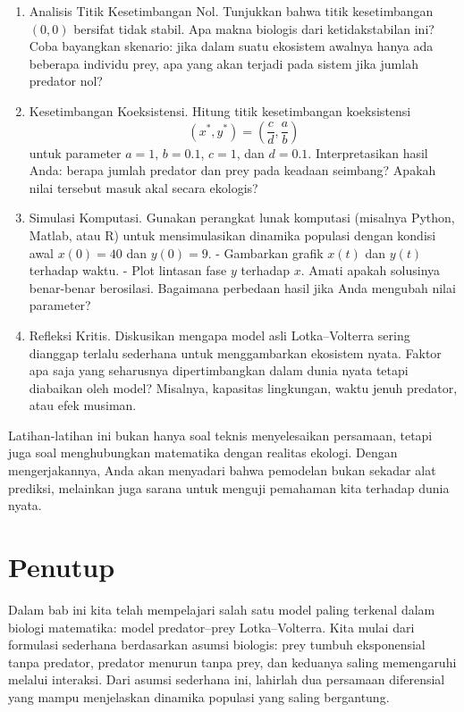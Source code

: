 \documentclass{bukumjh}
\begin{document}
\begin{enumerate}
    \item {\jsg Analisis Titik Kesetimbangan Nol.}  
    Tunjukkan bahwa titik kesetimbangan $(0,0)$ bersifat tidak stabil. Apa makna biologis dari ketidakstabilan ini? Coba bayangkan skenario: jika dalam suatu ekosistem awalnya hanya ada beberapa individu prey, apa yang akan terjadi pada sistem jika jumlah predator nol?

    \item {\jsg Kesetimbangan Koeksistensi.}  
    Hitung titik kesetimbangan koeksistensi
    \[
    \left(x^\ast, y^\ast\right) = \left(\frac{c}{d}, \frac{a}{b}\right)
    \]
    untuk parameter $a=1$, $b=0.1$, $c=1$, dan $d=0.1$. Interpretasikan hasil Anda: berapa jumlah predator dan prey pada keadaan seimbang? Apakah nilai tersebut masuk akal secara ekologis?

    \item {\jsg Simulasi Komputasi.}  
    Gunakan perangkat lunak komputasi (misalnya Python, Matlab, atau R) untuk mensimulasikan dinamika populasi dengan kondisi awal $x(0)=40$ dan $y(0)=9$.  
    - Gambarkan grafik $x(t)$ dan $y(t)$ terhadap waktu.  
    - Plot lintasan fase $y$ terhadap $x$.  
    Amati apakah solusinya benar-benar berosilasi. Bagaimana perbedaan hasil jika Anda mengubah nilai parameter?

    \item {\jsg Refleksi Kritis.}  
    Diskusikan mengapa model asli Lotka–Volterra sering dianggap terlalu sederhana untuk menggambarkan ekosistem nyata. Faktor apa saja yang seharusnya dipertimbangkan dalam dunia nyata tetapi diabaikan oleh model? Misalnya, kapasitas lingkungan, waktu jenuh predator, atau efek musiman.
\end{enumerate}

Latihan-latihan ini bukan hanya soal teknis menyelesaikan persamaan, tetapi juga soal menghubungkan matematika dengan realitas ekologi. Dengan mengerjakannya, Anda akan menyadari bahwa pemodelan bukan sekadar alat prediksi, melainkan juga sarana untuk menguji pemahaman kita terhadap dunia nyata.

\section{Penutup}

Dalam bab ini kita telah mempelajari salah satu model paling terkenal dalam biologi matematika: model predator–prey Lotka–Volterra. Kita mulai dari formulasi sederhana berdasarkan asumsi biologis: prey tumbuh eksponensial tanpa predator, predator menurun tanpa prey, dan keduanya saling memengaruhi melalui interaksi. Dari asumsi sederhana ini, lahirlah dua persamaan diferensial yang mampu menjelaskan dinamika populasi yang saling bergantung.
\end{document}
